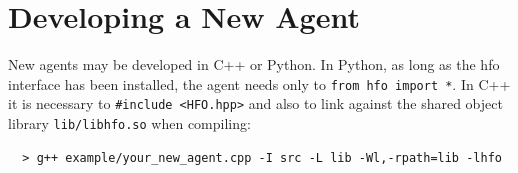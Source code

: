 \documentclass[12pt]{article}
\begin{document}
\section{Developing a New Agent}

New agents may be developed in C++ or Python. In Python, as long as
the hfo interface has been installed, the agent needs only to
\verb+from hfo import *+. In C++ it is necessary to
\verb+#include <HFO.hpp>+ and also to link against the shared object
library \verb+lib/libhfo.so+ when compiling:\\

\begin{verbatim}
  > g++ example/your_new_agent.cpp -I src -L lib -Wl,-rpath=lib -lhfo
\end{verbatim}



\end{document}
